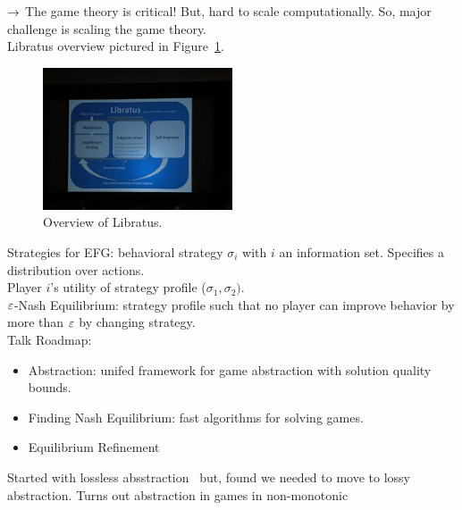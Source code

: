 $\rightarrow$ The game theory is critical! But, hard to scale computationally. So, major challenge is scaling the game theory. \\

Libratus overview pictured in Figure~\ref{fig:libratus}. \\

\begin{figure}[h!]
    \centering
    \includegraphics[width=0.5\textwidth]{images/libratus.JPG}
    \caption{Overview of Libratus.}
    \label{fig:libratus}
\end{figure}


Strategies for EFG: behavioral strategy $\sigma_i$ with $i$ an information set. Specifies a distribution over actions. \\

Player $i$'s utility of strategy profile ($\sigma_1, \sigma_2)$. \\

$\varepsilon$-Nash Equilibrium: strategy profile such that no player can improve behavior by more than $\varepsilon$ by changing strategy. \\

Talk Roadmap:
\begin{itemize}
    \item Abstraction: unifed framework for game abstraction with solution quality bounds.
    \item Finding Nash Equilibrium: fast algorithms for solving games.
    \item Equilibrium Refinement
\end{itemize}


Started with lossless absstraction~\cite{gilpin2007lossless} but, found we needed to move to lossy abstraction. Turns out abstraction in games in non-monotonic~\cite{waugh2009abstraction} \\

